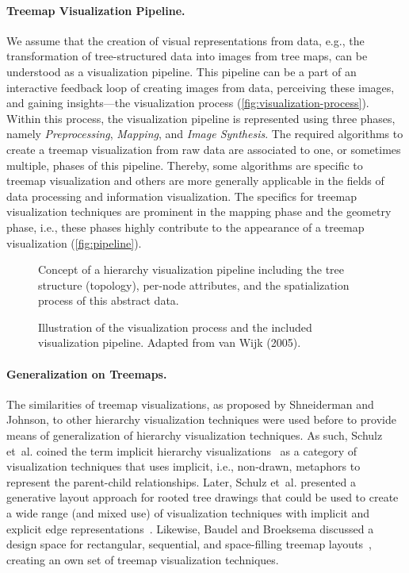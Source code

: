 \documentclass[a4paper,twoside]{article}
\begin{document}
\paragraph{Treemap Visualization Pipeline.}
\label{sec:pipeline}
We assume that the creation of visual representations from data, e.g., the transformation of tree-structured data into images from tree maps, can be understood as a visualization pipeline.
This pipeline can be a part of an interactive feedback loop of creating images from data, perceiving these images, and gaining insights---the visualization process (\autoref{fig:visualization-process}).
Within this process, the visualization pipeline is represented using three phases, namely \emph{Preprocessing}, \emph{Mapping}, and \emph{Image Synthesis}.
The required algorithms to create a treemap visualization from raw data are associated to one, or sometimes multiple, phases of this pipeline.
Thereby, some algorithms are specific to treemap visualization and others are more generally applicable in the fields of data processing and information visualization.
The specifics for treemap visualization techniques are prominent in the mapping phase and the geometry phase, i.e., these phases highly contribute to the appearance of a treemap visualization (\autoref{fig:pipeline}).
\begin{figure}[b]
	\centering
	
	\caption{Concept of a hierarchy visualization pipeline including the tree structure (topology), per-node attributes, and the spatialization process of this abstract data.}
	\label{fig:pipeline}
\end{figure}
\begin{figure}[t]
	\centering
	
	\caption{%
		Illustration of the visualization process and the included visualization pipeline.
		Adapted from van Wijk (2005).%
	}
	\label{fig:visualization-process}
\end{figure}
	
\paragraph{Generalization on Treemaps.}
\label{sec:generalization}
The similarities of treemap visualizations, as proposed by Shneiderman and Johnson, to other hierarchy visualization techniques were used before to provide means of generalization of hierarchy visualization techniques.
As such, Schulz et~al. coined the term implicit hierarchy visualizations~\cite{schulz2011-implicit} as a category of visualization techniques that uses implicit, i.e., non-drawn, metaphors to represent the parent-child relationships.
Later, Schulz et~al. presented a generative layout approach for rooted tree drawings that could be used to create a wide range (and mixed use) of visualization techniques with implicit and explicit edge representations~\cite{schulz2013-generativelayout}.
Likewise, Baudel and Broeksema discussed a design space for rectangular, sequential, and space-filling treemap layouts~\cite{baudel2012-designspace}, creating an own set of treemap visualization techniques.
\end{document}
